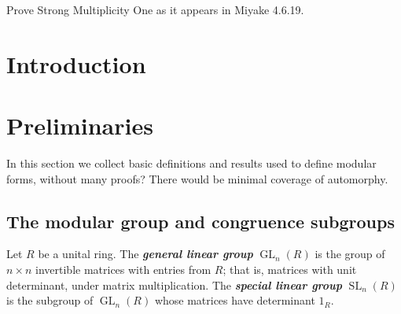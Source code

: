 \documentclass[11pt,leqno]{article}
\newcommand{\textib}[1]{\textbf{\textit{#1}}}
\DeclareMathOperator{\GL}{GL}
\DeclareMathOperator{\SL}{SL}
\begin{document}
Prove Strong Multiplicity One as it appears in Miyake 4.6.19.
\tableofcontents
\newpage

\section{Introduction}

\newpage\section{Preliminaries} In this section we collect basic definitions and results used to define modular forms, without many proofs? There would be minimal coverage of automorphy.
\subsection{The modular group and congruence subgroups}
Let $R$ be a unital ring. The \textib{general linear group} $\GL_n(R)$ is the group of $n\times n$ invertible matrices with entries from $R$; that is, matrices with unit determinant, under matrix multiplication. The \textib{special linear group} $\SL_n(R)$ is the subgroup of $\GL_n(R)$ whose matrices have determinant $1_R$.
\end{document}

